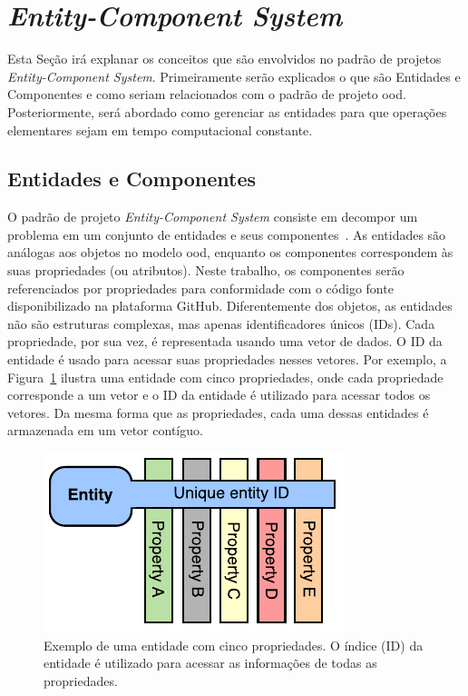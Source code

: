 \section{\textit{Entity-Component System}}
\label{sec:entity_component_system}

Esta Seção irá explanar os conceitos que são envolvidos no padrão de projetos \textit{Entity-Component System}.
Primeiramente serão explicados o que são Entidades e Componentes e como seriam relacionados com o padrão de projeto \ac{ood}.
Posteriormente, será abordado como gerenciar as entidades para que operações elementares sejam em tempo computacional constante.

\subsection{Entidades e Componentes}

O padrão de projeto \textit{Entity-Component System} consiste em decompor um problema em um conjunto de entidades e seus componentes~\cite{nystrom2014game}. As entidades são análogas aos objetos no modelo \ac{ood}, enquanto os componentes correspondem às suas propriedades (ou atributos). Neste trabalho, os componentes serão referenciados por propriedades para conformidade com o código fonte disponibilizado na plataforma GitHub. Diferentemente dos objetos, as entidades não são estruturas complexas, mas apenas identificadores únicos (IDs). Cada propriedade, por sua vez, é representada usando uma vetor de dados. O ID da entidade é usado para acessar suas propriedades nesses vetores. Por exemplo, a Figura~\ref{fig:entity_example} ilustra uma entidade com cinco propriedades, onde cada propriedade corresponde a um vetor e o ID da entidade é utilizado para acessar todos os vetores. Da mesma forma que as propriedades, cada uma dessas entidades é armazenada em um vetor contíguo.

\begin{figure}[ht]
    \centering
    \includegraphics[width=0.5\linewidth]{img/tecnica/entity}
    \caption[Exemplo de uma entidade]{Exemplo de uma entidade com cinco propriedades. O índice (ID) da entidade é utilizado para acessar as informações de todas as propriedades.}
    \label{fig:entity_example}
\end{figure}

